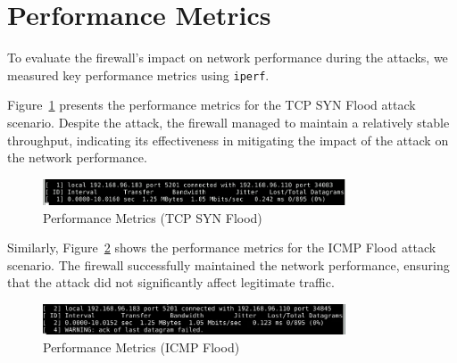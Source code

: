 \section{Performance Metrics}
To evaluate the firewall's impact on network performance during the attacks, we measured key performance metrics using \texttt{iperf}.

Figure~\ref{fig:TCPSYNFloodPerformanceMetrics} presents the performance metrics for the TCP SYN Flood attack scenario. Despite the attack, the firewall managed to maintain a relatively stable throughput, indicating its effectiveness in mitigating the impact of the attack on the network performance.

\begin{figure}[H]
\centering
\includegraphics[width=0.8\textwidth]{img/level4/level4-performance-metrics-TCPSYNFlood.png}
\caption{Performance Metrics (TCP SYN Flood)}\label{fig:TCPSYNFloodPerformanceMetrics}
\end{figure}

Similarly, Figure~\ref{fig:ICMPFloodPerformanceMetrics} shows the performance metrics for the ICMP Flood attack scenario. The firewall successfully maintained the network performance, ensuring that the attack did not significantly affect legitimate traffic.

\begin{figure}[H]
\centering
\includegraphics[width=0.8\textwidth]{img/level4/level4-performance-metrics-ICMPFlood.png}
\caption{Performance Metrics (ICMP Flood)}\label{fig:ICMPFloodPerformanceMetrics}
\end{figure}